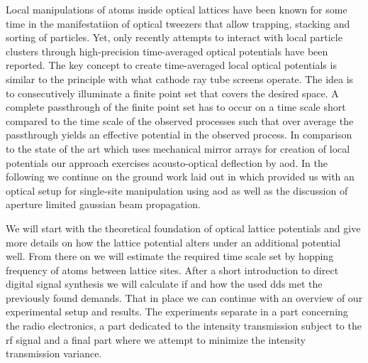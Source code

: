 Local manipulations of atoms inside optical lattices have been known for some
time in the manifestatiion of optical tweezers that allow trapping, stacking
and sorting of particles\cite{Roxworthy2012}. Yet, only recently attempts to
interact with local particle clusters through high-precision time-averaged
optical potentials have been reported\cite{Roy2016}. The key concept to create
time-averaged local optical potentials is similar to the principle with what
cathode ray tube screens operate. The idea is to consecutively illuminate a
finite point set that covers the desired space. A complete passthrough of the
finite point set has to occur on a time scale short compared to the time scale
of the observed processes such that over average the passthrough yields an
effective potential in the observed process. In comparison to the state of the
art which uses mechanical mirror arrays for creation of local potentials
\cite{Roy2016} our approach exercises acousto-optical deflection by \gls{aod}.
In the following we continue on the ground work laid out in
\cite{Hertlein2017} which provided us with an optical setup for single-site
manipulation using \gls{aod} as well as the discussion of aperture limited
gaussian beam propagation.

We will start with the theoretical foundation of optical lattice potentials
and give more details on how the lattice potential alters under an additional
potential well. From there on we will estimate the required time scale set by
hopping frequency of atoms between lattice sites. After a short introduction
to direct digital signal synthesis we will calculate if and how the used
\gls{dds} met the previously found demands. That in place we can continue with
an overview of our experimental setup and results. The experiments separate in
a part concerning the radio electronics, a part dedicated to the intensity
transmission subject to the \gls{rf} signal and a final part where we attempt
to minimize the intensity transmission variance.
